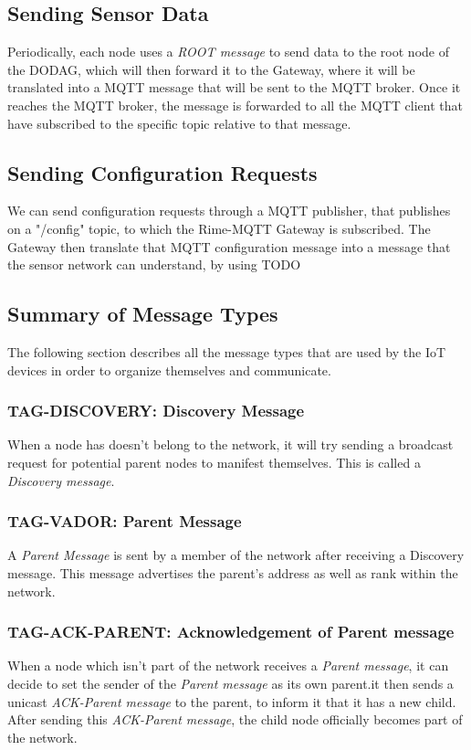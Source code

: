 \documentclass[a4paper,11pt]{article}
\begin{document}
\subsection{Sending Sensor Data}
Periodically, each node uses a \textit{ROOT message} to send data to the root node of the DODAG, which will then forward it to the Gateway, where it will be translated into a MQTT message that will be sent to the MQTT broker. Once it reaches the MQTT broker, the message is forwarded to all the MQTT client that have subscribed to the specific topic relative to that message.

\subsection{Sending Configuration Requests}
We can send configuration requests through a MQTT publisher, that publishes on a "/config" topic, to which the Rime-MQTT Gateway is subscribed. The Gateway then translate that MQTT configuration message into a message that the sensor network can understand, by using TODO


\subsection{Summary of Message Types}
The following section describes all the message types that are used by the IoT devices in order to organize themselves and communicate.

\subsubsection{TAG-DISCOVERY: Discovery Message}
When a node has doesn't belong to the network, it will try sending a broadcast request for potential parent nodes to manifest themselves. This is called a \textit{Discovery message}.

\subsubsection{TAG-VADOR: Parent Message}
A \textit{Parent Message} is sent by a member of the network after receiving a Discovery message. This message advertises the parent's address as well as rank within the network.

\subsubsection{TAG-ACK-PARENT: Acknowledgement of Parent message}
When a node which isn't part of the network receives a \textit{Parent message}, it can decide to set the sender of the \textit{Parent message} as its own parent.it then sends a unicast \textit{ACK-Parent message} to the parent, to inform it that it has a new child. After sending this \textit{ACK-Parent message}, the child node officially becomes part of the network.
\end{document}
